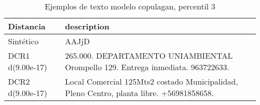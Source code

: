 \begin{table}[H]
\centering
\fontsize{10}{14}\selectfont
\caption{Ejemplos de texto modelo copulagan, percentil 3}
\label{table-example-economicos-b-3-copulagan-3p-text}
\begin{tabular}{|l|m{35em}|}
\hline
\rowcolor[gray]{0.8}
Distancia & description \\
\hline Sintético & AAJjD \\
\hline DCR1 d(9.00e-17) & 265.000. DEPARTAMENTO UNIAMBIENTAL Orompello 129. Entrega inmediata. 963722633. \\
\hline DCR2 d(9.00e-17) & Local Comercial 125Mts2 costado Municipalidad, Pleno Centro, planta libre. +56981858658. \\
\hline
\end{tabular}
\end{table}
